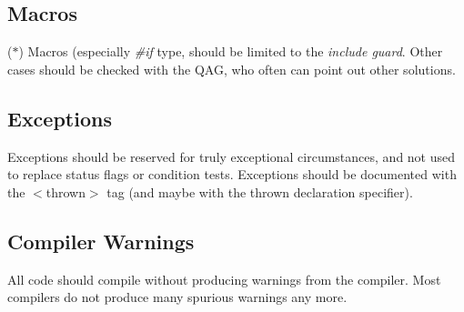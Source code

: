 \subsection {Macros} ($\ast$) \bmar
Macros (especially {\it \#if} type, should be limited
   to the {\it include guard}. Other cases should be checked with the QAG,
   who often can point out other solutions.
\subsection {Exceptions}
Exceptions should be reserved for truly exceptional circumstances, and
not used to replace status flags or condition tests. Exceptions should be
documented with the $<$thrown$>$ tag (and maybe with the thrown declaration
specifier). 
\subsection {Compiler Warnings}
All code should compile without producing warnings from the 
\bmar compiler. Most compilers do not produce many spurious warnings any more.


